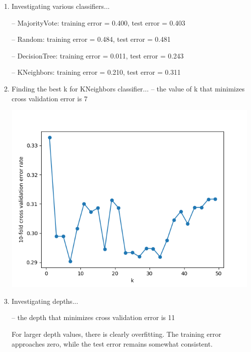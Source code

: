 \documentclass[11pt]{article}
\newcommand{\solution}[1]{{{\color{blue}{\bf Solution:} {#1}}}}
\begin{document}
\begin{enumerate}
{	-- training error for k=3: 0.167
	
	-- training error for k=5: 0.201
	
	-- training error for k=7: 0.240
}

\item %
\solution{
Investigating various classifiers...

	-- MajorityVote: training error = 0.400, test error = 0.403
	
	-- Random:       training error = 0.484, test error = 0.481
	
	-- DecisionTree: training error = 0.011, test error = 0.243
	
	-- KNeighbors:   training error = 0.210, test error = 0.311
}

\item %
\solution{
Finding the best k for KNeighbors classifier...
	-- the value of k that minimizes cross validation error is 7
}

\includegraphics[width=\linewidth]{KNN-CV.png}

\item %
\solution{
Investigating depths...

	-- the depth that minimizes cross validation error is 11
	
For larger depth values, there is clearly overfitting. The training error approaches zero, while the test error remains somewhat consistent.
}


\end{enumerate}
\end{document}
